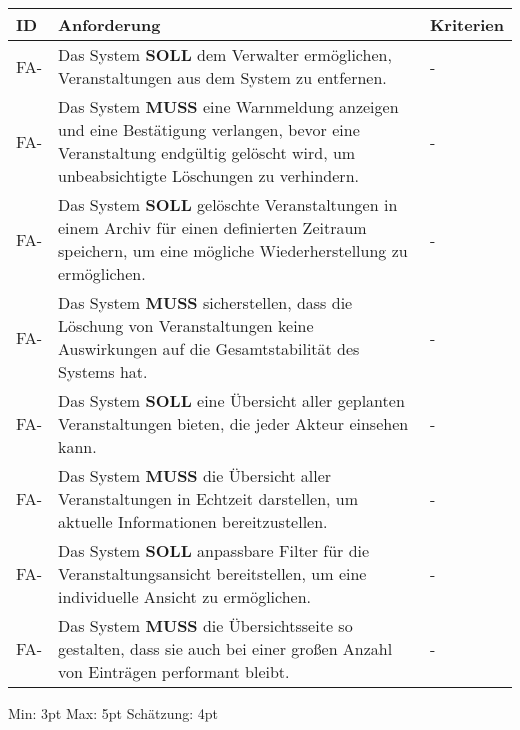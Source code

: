 \newpage

\begin{tabular} {|p{}|p{11cm}|p{}|}
	\hline
	ID & Anforderung & Kriterien \\
	\hline
	FA-
	& Das System \textbf{SOLL} dem Verwalter ermöglichen, Veranstaltungen aus dem System zu entfernen. 
	& - \\
	\hline
	FA-
	& Das System \textbf{MUSS} eine Warnmeldung anzeigen und eine Bestätigung verlangen, bevor eine Veranstaltung endgültig gelöscht wird, um unbeabsichtigte Löschungen zu verhindern. 
	& - \\
	\hline
	FA-
	& Das System \textbf{SOLL} gelöschte Veranstaltungen in einem Archiv für einen definierten Zeitraum speichern, um eine mögliche Wiederherstellung zu ermöglichen. 
	& - \\
	\hline
	FA-
	& Das System \textbf{MUSS} sicherstellen, dass die Löschung von Veranstaltungen keine Auswirkungen auf die Gesamtstabilität des Systems hat. 
	& - \\
	\hline
	FA-
	& Das System \textbf{SOLL} eine Übersicht aller geplanten Veranstaltungen bieten, die jeder Akteur einsehen kann. 
	& - \\
	\hline
	FA-
	& Das System \textbf{MUSS} die Übersicht aller Veranstaltungen in Echtzeit darstellen, um aktuelle Informationen bereitzustellen. 
	& - \\
	\hline
	FA-
	& Das System \textbf{SOLL} anpassbare Filter für die Veranstaltungsansicht bereitstellen, um eine individuelle Ansicht zu ermöglichen. 
	& - \\
	\hline
	FA-
	& Das System \textbf{MUSS} die Übersichtsseite so gestalten, dass sie auch bei einer großen Anzahl von Einträgen performant bleibt. 
	& - \\
	\hline
\end{tabular}
Min: 3pt
Max: 5pt
Schätzung: 4pt

\newpage

